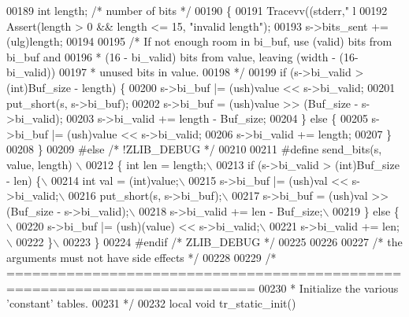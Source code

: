 \begin{DoxyCode}
{00189     \textcolor{keywordtype}{int} length; \textcolor{comment}{/* number of bits */}
00190 \{
00191     Tracevv((stderr,\textcolor{stringliteral}{" l %
00192     Assert(length > 0 && length <= 15, \textcolor{stringliteral}{"invalid length"});
00193     s->bits\_sent += (ulg)length;
00194 
00195     \textcolor{comment}{/* If not enough room in bi\_buf, use (valid) bits from bi\_buf and}
00196 \textcolor{comment}{     * (16 - bi\_valid) bits from value, leaving (width - (16-bi\_valid))}
00197 \textcolor{comment}{     * unused bits in value.}
00198 \textcolor{comment}{     */}
00199     \textcolor{keywordflow}{if} (s->bi\_valid > (\textcolor{keywordtype}{int})Buf\_size - length) \{
00200         s->bi\_buf |= (ush)value << s->bi\_valid;
00201         put\_short(s, s->bi\_buf);
00202         s->bi\_buf = (ush)value >> (Buf\_size - s->bi\_valid);
00203         s->bi\_valid += length - Buf\_size;
00204     \} \textcolor{keywordflow}{else} \{
00205         s->bi\_buf |= (ush)value << s->bi\_valid;
00206         s->bi\_valid += length;
00207     \}
00208 \}
00209 \textcolor{preprocessor}{#else }\textcolor{comment}{/* !ZLIB\_DEBUG */}\textcolor{preprocessor}{}
00210 
00211 \textcolor{preprocessor}{#define send\_bits(s, value, length) \(\backslash\)}
00212 \textcolor{preprocessor}{\{ int len = length;\(\backslash\)}
00213 \textcolor{preprocessor}{  if (s->bi\_valid > (int)Buf\_size - len) \{\(\backslash\)}
00214 \textcolor{preprocessor}{    int val = (int)value;\(\backslash\)}
00215 \textcolor{preprocessor}{    s->bi\_buf |= (ush)val << s->bi\_valid;\(\backslash\)}
00216 \textcolor{preprocessor}{    put\_short(s, s->bi\_buf);\(\backslash\)}
00217 \textcolor{preprocessor}{    s->bi\_buf = (ush)val >> (Buf\_size - s->bi\_valid);\(\backslash\)}
00218 \textcolor{preprocessor}{    s->bi\_valid += len - Buf\_size;\(\backslash\)}
00219 \textcolor{preprocessor}{  \} else \{\(\backslash\)}
00220 \textcolor{preprocessor}{    s->bi\_buf |= (ush)(value) << s->bi\_valid;\(\backslash\)}
00221 \textcolor{preprocessor}{    s->bi\_valid += len;\(\backslash\)}
00222 \textcolor{preprocessor}{  \}\(\backslash\)}
00223 \textcolor{preprocessor}{\}}
00224 \textcolor{preprocessor}{#endif }\textcolor{comment}{/* ZLIB\_DEBUG */}\textcolor{preprocessor}{}
00225 
00226 
00227 \textcolor{comment}{/* the arguments must not have side effects */}
00228 
00229 \textcolor{comment}{/* ===========================================================================}
00230 \textcolor{comment}{ * Initialize the various 'constant' tables.}
00231 \textcolor{comment}{ */}
00232 local \textcolor{keywordtype}{void} tr\_static\_init()
}}
\end{DoxyCode}
